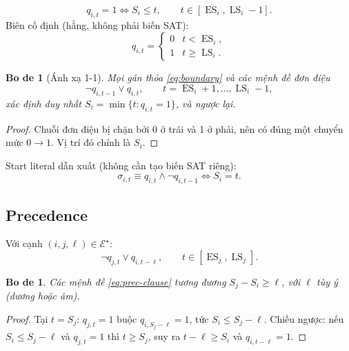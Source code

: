 \documentclass[11pt,a4paper]{article}
\newtheorem{lemma}[theorem]{Bo de}
\theoremstyle{remark}
\newcommand{\ES}{\operatorname{ES}}
\newcommand{\LS}{\operatorname{LS}}
\begin{document}
\begin{equation}
  q_{i,t} = 1 \iff S_i \le t, \qquad t \in [\ES_i, \LS_i - 1].
  \label{eq:order-var}
\end{equation}
Biên cố định (hằng, không phải biến SAT):
\begin{equation}
  q_{i,t} = \begin{cases} 0 & t < \ES_i,\\ 1 & t \ge \LS_i. \end{cases}
  \label{eq:boundary}
\end{equation}

\begin{lemma}[Ánh xạ 1-1]
\label{lem:transition}
Mọi gán thỏa \eqref{eq:boundary} và các mệnh đề đơn điệu
\begin{equation}
  \neg q_{i,t-1} \lor q_{i,t}, \qquad t = \ES_i + 1, \ldots, \LS_i - 1,
  \label{eq:monotone}
\end{equation}
xác định duy nhất $S_i = \min\{t : q_{i,t} = 1\}$, và ngược lại.
\end{lemma}

\begin{proof}
Chuỗi đơn điệu bị chặn bởi 0 ở trái và 1 ở phải, nên có đúng một chuyển
mức $0 \to 1$. Vị trí đó chính là $S_i$.
\end{proof}

Start literal dẫn xuất (không cần tạo biến SAT riêng):
\[
  \sigma_{i,t} \equiv q_{i,t} \land \neg q_{i,t-1} \iff S_i = t.
\]

\subsection{Precedence}

Với cạnh $(i, j, \ell) \in \mathcal{E}^\star$:
\begin{equation}
  \neg q_{j,t} \lor q_{i,t-\ell}, \qquad t \in [\ES_j, \LS_j].
  \label{eq:prec-clause}
\end{equation}

\begin{lemma}
\label{lem:prec}
Các mệnh đề \eqref{eq:prec-clause} tương đương $S_j - S_i \ge \ell$,
với $\ell$ tùy ý (dương hoặc âm).
\end{lemma}

\begin{proof}
Tại $t = S_j$: $q_{j,t}=1$ buộc $q_{i,S_j-\ell}=1$, tức $S_i \le S_j - \ell$.
Chiều ngược: nếu $S_i \le S_j - \ell$ và $q_{j,t}=1$ thì $t \ge S_j$,
suy ra $t-\ell \ge S_i$ và $q_{i,t-\ell}=1$.
\end{proof}
\end{document}
